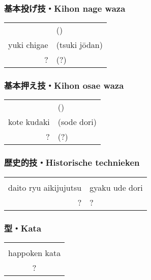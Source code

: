 \subsubsection{基本投げ技・Kihon nage waza}
\begin{table}[H]
\begin{center}
\begin{tabular}{rl}
    \ruby{}{}\ruby{}{} & (\ruby{}{})\\
    yuki chigae & (tsuki j\={o}dan)\\
    ? & (?)
\end{tabular}
\end{center}
\label{kyuu_4_kihon_nage_waza}
\end{table}

\subsubsection{基本押え技・Kihon osae waza}
\begin{table}[H]
\begin{center}
\begin{tabular}{rl}
    \ruby{}{}\ruby{}{} & (\ruby{}{})\\
    kote kudaki & (sode dori)\\
    ? & (?)
\end{tabular}
\end{center}
\label{kyuu_4_kihon_osae_waza}
\end{table}

\subsubsection{歴史的技・Historische technieken}
\begin{table}[H]
\begin{center}
\begin{tabular}{rl}
    \ruby{}{}\ruby{}{} & \\
    daito ryu aikijujutsu & gyaku ude dori\\
    ? & ?
\end{tabular}
\end{center}
\label{kyuu_4_historic}
\end{table}

\subsubsection{型・Kata}
\begin{table}[H]
\begin{center}
\begin{tabular}{c}
    \ruby{}{}\ruby{}{}\\
    happoken kata\\
    ?
\end{tabular}
\end{center}
\label{kyuu_4_kata}
\end{table}

